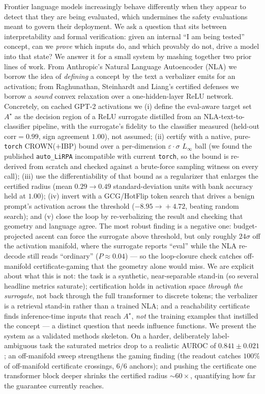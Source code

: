 Frontier language models increasingly behave differently when they appear to
detect that they are being evaluated, which undermines the safety evaluations
meant to govern their deployment. We ask a question that sits between
interpretability and formal verification: given an internal ``I am being tested''
concept, can we \emph{prove} which inputs do, and which provably do not, drive a
model into that state? We answer it for a small system by mashing together two
prior lines of work. From Anthropic's Natural Language Autoencoder (NLA) we borrow
the idea of \emph{defining} a concept by the text a verbalizer emits for an
activation; from Raghunathan, Steinhardt and Liang's certified defenses we borrow
a \emph{sound} convex relaxation over a one-hidden-layer ReLU network. Concretely,
on cached GPT-2 activations we (i) define the eval-aware target set $A^\star$ as
the decision region of a ReLU surrogate distilled from an NLA-text-to-classifier
pipeline, with the surrogate's fidelity to the classifier measured (held-out
$\mathrm{corr}=0.99$, sign agreement $1.00$), not assumed; (ii) certify with a
native, pure-\texttt{torch} CROWN($+$IBP) bound over a per-dimension
$\varepsilon\!\cdot\!\sigma$ $L_\infty$ ball (we found the published
\texttt{auto\_LiRPA} incompatible with current \texttt{torch}, so the bound is
re-derived from scratch and checked against a brute-force sampling witness on every
call); (iii) use the differentiability of that bound as a regularizer that enlarges
the certified radius (mean $0.29\!\to\!0.49$ standard-deviation units with bank
accuracy held at $1.00$); (iv) invert with a GCG/HotFlip token search that drives a
benign prompt's activation across the threshold ($-8.95\!\to\!+4.72$, beating
random search); and (v) close the loop by re-verbalizing the result and checking
that geometry and language agree. The most robust finding is a negative one:
budget-projected ascent can force the surrogate above threshold, but only roughly
$24\sigma$ off the activation manifold, where the surrogate reports ``eval'' while
the NLA re-decode still reads ``ordinary'' ($P\!\approx\!0.04$) --- so the
loop-closure check catches off-manifold certificate-gaming that the geometry alone
would miss. We are explicit about what this is not: the task is a synthetic,
near-separable stand-in (so several headline metrics saturate); certification
holds in activation space \emph{through the surrogate}, not back through the full
transformer to discrete tokens; the verbalizer is a retrieval stand-in rather than
a trained NLA; and a reachability certificate finds inference-time inputs that
reach $A^\star$, \emph{not} the training examples that instilled the concept --- a
distinct question that needs influence functions. We present the system as a
validated methods skeleton. On a harder, deliberately label-ambiguous task the
saturated metrics drop to a realistic AUROC of $0.841\pm0.021$; an off-manifold
sweep strengthens the gaming finding (the readout catches $100\%$ of off-manifold
certificate crossings, $6/6$ anchors); and pushing the certificate one transformer
block deeper shrinks the certified radius ${\sim}60\times$, quantifying how far the
guarantee currently reaches.
